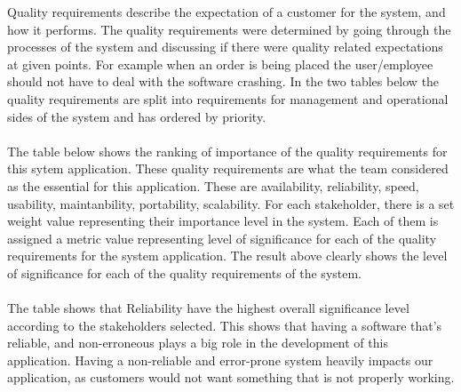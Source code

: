 Quality requirements describe the expectation of a customer for the system, and how it performs. The quality requirements were determined by going through the processes of the system and discussing if there were quality related expectations at given points. For example when an order is being placed the user/employee should not have to deal with the software crashing. In the two tables below the quality requirements are split into requirements for management and operational sides of the system and has ordered by priority. \\ \\The table below shows the ranking of importance of the quality requirements for this sytem application. These quality requirements are what the team considered as the essential for this application. These are availability, reliability, speed, usability, maintanbility, portability, scalability.
For each stakeholder, there is a set weight value representing their importance level in the system. Each of them is assigned a metric value representing level of significance for each of the quality requirements for the system application. The result above clearly shows the level of significance for each of the quality requirements of the system.\\ \\
The table shows that Reliability have the highest overall significance level according to the stakeholders selected. This shows that having a software that's reliable, and non-erroneous plays a big role in the development of this application. Having a non-reliable and error-prone system heavily impacts our application, as customers would not want something that is not properly working. 


